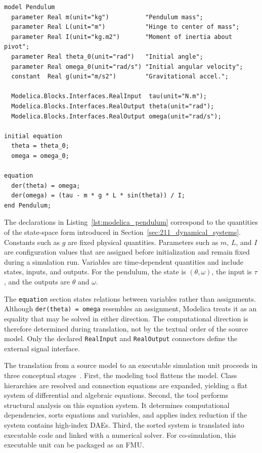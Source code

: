 \begin{listing}[htbp]
\begin{lstlisting}[style=modelica]
model Pendulum
  parameter Real m(unit="kg")          "Pendulum mass";
  parameter Real L(unit="m")           "Hinge to center of mass";
  parameter Real I(unit="kg.m2")       "Moment of inertia about pivot";
  parameter Real theta_0(unit="rad")   "Initial angle";
  parameter Real omega_0(unit="rad/s") "Initial angular velocity";
  constant  Real g(unit="m/s2")        "Gravitational accel.";

  Modelica.Blocks.Interfaces.RealInput  tau(unit="N.m");
  Modelica.Blocks.Interfaces.RealOutput theta(unit="rad");
  Modelica.Blocks.Interfaces.RealOutput omega(unit="rad/s");

initial equation
  theta = theta_0;
  omega = omega_0;

equation
  der(theta) = omega;
  der(omega) = (tau - m * g * L * sin(theta)) / I;
end Pendulum;
\end{lstlisting}
\caption[Modelica pendulum realization]{Modelica realization of the pendulum from Section~\ref{sec:211_dynamical_systems}. Parameter values are omitted.}
\label{lst:modelica_pendulum}
\end{listing}

The declarations in Listing~\ref{lst:modelica_pendulum} correspond to the quantities of the state-space form introduced in Section~\ref{sec:211_dynamical_systems}.
Constants such as $g$ are fixed physical quantities.
Parameters such as $m$, $L$, and $I$ are configuration values that are assigned before initialization and remain fixed during a simulation run.
Variables are time-dependent quantities and include states, inputs, and outputs.
For the pendulum, the state is $(\theta,\omega)$, the input is $\tau$, and the outputs are $\theta$ and $\omega$.

The \texttt{equation} section states relations between variables rather than assignments.
Although \texttt{der(theta) = omega} resembles an assignment, Modelica treats it as an equality that may be solved in either direction.
The computational direction is therefore determined during translation, not by the textual order of the source model.
Only the declared \texttt{RealInput} and \texttt{RealOutput} connectors define the external signal interface.

The translation from a source model to an executable simulation unit proceeds in three conceptual stages~\cite{Modelica_Fritzson}.
First, the modeling tool flattens the model.
Class hierarchies are resolved and connection equations are expanded, yielding a flat system of differential and algebraic equations.
Second, the tool performs structural analysis on this equation system.
It determines computational dependencies, sorts equations and variables, and applies index reduction if the system contains high-index \acp{DAE}.
Third, the sorted system is translated into executable code and linked with a numerical solver.
For co-simulation, this executable unit can be packaged as an \ac{FMU}.

